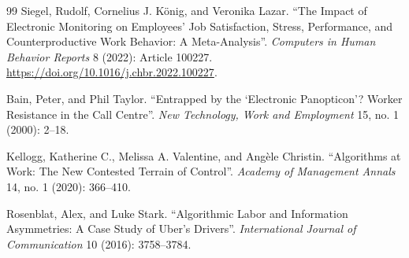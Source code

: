 \documentclass[10pt]{article}
\begin{document}
\begin{thebibliography}{99}
 Siegel, Rudolf, Cornelius J. K\"onig, and Veronika Lazar. ``The Impact of Electronic Monitoring on Employees' Job Satisfaction, Stress, Performance, and Counterproductive Work Behavior: A Meta-Analysis''. \emph{Computers in Human Behavior Reports} 8 (2022): Article 100227. \url{https://doi.org/10.1016/j.chbr.2022.100227}.

 Bain, Peter, and Phil Taylor. ``Entrapped by the `Electronic Panopticon'? Worker Resistance in the Call Centre''. \emph{New Technology, Work and Employment} 15, no. 1 (2000): 2--18.

 Kellogg, Katherine C., Melissa A. Valentine, and Ang\`ele Christin. ``Algorithms at Work: The New Contested Terrain of Control''. \emph{Academy of Management Annals} 14, no. 1 (2020): 366--410.

 Rosenblat, Alex, and Luke Stark. ``Algorithmic Labor and Information Asymmetries: A Case Study of Uber's Drivers''. \emph{International Journal of Communication} 10 (2016): 3758--3784.

\end{thebibliography}
\end{document}
